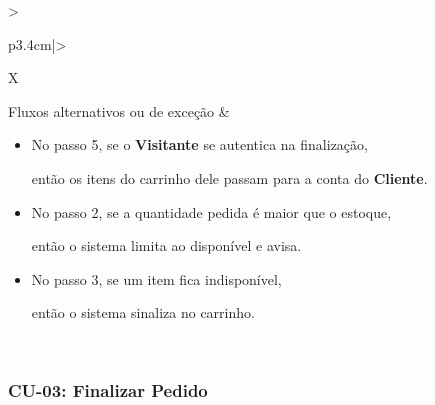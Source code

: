 \documentclass[12pt,a4paper]{article}
\begin{document}
{\begin{xltabular}{\textwidth}{>{\raggedright\arraybackslash}p{3.4cm}|>{\raggedright\arraybackslash}X}
Fluxos alternativos ou de exceção & \begin{itemize}[nosep,leftmargin=2.2em,labelwidth=2.2em,labelsep=0pt,align=left,itemsep=4pt,before=\vspace{-\baselineskip},after=\vspace{-0.4\baselineskip}]\item[\textbf{A1}] No passo 5, se o \textbf{Visitante} se autentica na finalização,\par então os itens do carrinho dele passam para a conta do \textbf{Cliente}. \item[\textbf{E1}] No passo 2, se a quantidade pedida é maior que o estoque,\par então o sistema limita ao disponível e avisa. \item[\textbf{E2}] No passo 3, se um item fica indisponível,\par então o sistema sinaliza no carrinho.\end{itemize}\\ \bottomrule
\end{xltabular}}

\Needspace{200pt}
\subsubsection{CU-03: Finalizar Pedido}
\end{document}
